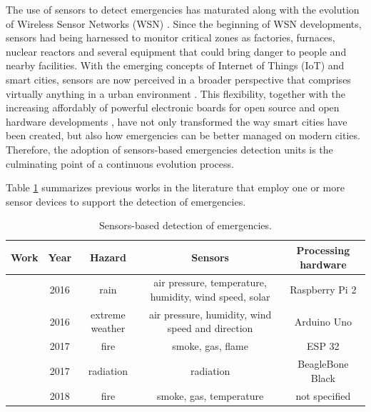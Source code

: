 \begin{refsection}
The use of sensors to detect emergencies has maturated along with the evolution of Wireless Sensor Networks (WSN) \cite{surveywsn2}. Since the beginning of WSN developments, sensors had being harnessed to monitor critical zones as factories, furnaces, nuclear reactors and several equipment that could bring danger to people and nearby facilities. With the emerging concepts of Internet of Things (IoT) and smart cities, sensors are now perceived in a broader perspective that comprises virtually anything in a urban environment \cite{smartsensing1,smartsensing3}. This flexibility, together with the increasing affordably of powerful electronic boards for open source and open hardware developments \cite{PlatformsSC}, have not only transformed the way smart cities have been created, but also how emergencies can be better managed on modern cities. Therefore, the adoption of sensors-based emergencies detection units is the culminating point of a continuous evolution process. 

Table \ref{Tab:sensorsbased} summarizes previous works in the literature that employ one or more sensor devices to support the detection of emergencies.

\begin{table}
\centering
\caption{Sensors-based detection of emergencies.}
\label{Tab:sensorsbased}
\begin{tabular}{|c|c|c|c|c|}
    \textbf{Work} & \textbf{Year} & \textbf{Hazard} & \textbf{Sensors} & \textbf{Processing hardware}\\

    \hline
    \citeauthor{iotRain1} \cite{iotRain1} & 2016 & rain & air pressure, temperature, humidity, wind speed, solar & Raspberry Pi 2 \\

    \hline
    \citeauthor{iotRain2} \cite{iotRain2} & 2016 & extreme weather & air pressure, humidity, wind speed and direction & Arduino Uno \\
    
    \hline
    \citeauthor{iotFire4} \cite{iotFire4} & 2017 & fire & smoke, gas, flame & ESP 32\\
    
    \hline
    \citeauthor{iotRadiation1} \cite{iotRadiation1} & 2017 & radiation & radiation & BeagleBone Black \\
    
    \hline
    \citeauthor{iotFire1} \cite{iotFire1} &  2018 & fire & smoke, gas, temperature & not specified \\


\end{tabular}
\end{table}
\end{refsection}
